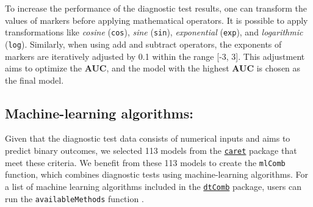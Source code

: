 \documentclass[10pt]{article}
\newcommand{\CRANpkg}[1]{\href{https://CRAN.R-project.org/package=#1}{\texttt{#1}}}
\newcommand{\Rfunction}[1]{\texttt{#1}}
\begin{document}
To increase the performance of the diagnostic test results, one can transform the values of markers before applying mathematical operators. It is possible to apply transformations like \emph{cosine} (\texttt{cos}), \emph{sine} (\texttt{sin}), \emph{exponential} (\texttt{exp}), and \emph{logarithmic} (\texttt{log}). Similarly, when using add and subtract operators, the exponents of markers are iteratively adjusted by 0.1 within the range [-3, 3]. This adjustment aims to optimize the \textbf{AUC}, and the model with the highest \textbf{AUC} is chosen as the final model.
\subsection{Machine-learning algorithms:}
Given that the diagnostic test data consists of numerical inputs and aims to predict binary outcomes, we selected 113 models from the \CRANpkg{caret} package that meet these criteria. We benefit from these 113 models to create the \Rfunction{mlComb} function, which combines diagnostic tests using machine-learning algorithms. For a list of machine learning algorithms included in the \CRANpkg{dtComb} package, users can run the \Rfunction{availableMethods} function \citep{kuhn2008building}.
\end{document}
